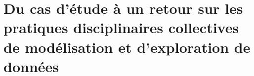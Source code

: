 \part{Du cas d'étude à un retour sur les pratiques disciplinaires collectives de modélisation et d'exploration de données} 
